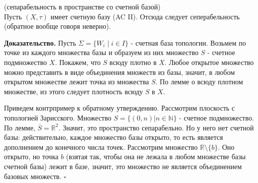 \begin{theor}
    (сепарабельность в пространстве со счетной базой)\\
    Пусть $(X,\tau)$ имеет счетную базу (AC II). Отсюда следует сеперабельность
    (обратное вообще говоря неверно).
\end{theor}
\textbf{Доказательство.} Пусть $\Sigma=\{W_i\mid i \in I\}$ - счетная база
топологии. Возьмем по точке из каждого множества базы и образуем из них
множество $S$ - счетное подмножество $X$. Покажем, что $S$ всюду плотно в $X$. 
Любое открытое множество можно представить в виде объединения множеств из
базы, значит, в любом открытом множестве лежит точка из множества $S$. 
По лемме о всюду плотном множестве, из этого следует плотность всюду $S$ в 
$X$.

Приведем контрпример к обратному утверждению. Рассмотрим  плоскость с 
топологией Зарисского. Множество $S=\{(0,n)|n\in \mathbb{N}\}$ - 
счетное подмножество. По лемме, $\overline{S}=\mathbb{R}^2$. Значит, это
пространство сепарабельно. Но у него нет счетной базы: действительно, каждое
множество базы открыто, то есть является дополнением до конечного числа 
точек. Рассмотрим множество $\mathbb{R}\setminus \{b\}$. Оно открыто, 
но точка $b$ (взятая так, чтобы она не лежала в любом множестве базы счетной 
базы) лежит в базе, значит, это множество не является объединением
базовых множеств. $\square$ 
